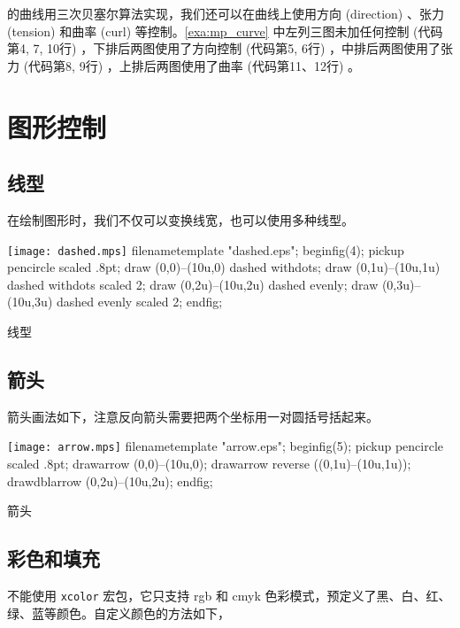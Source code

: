 \MP 的曲线用三次贝塞尔算法实现，我们还可以在曲线上使用方向 (direction) 、张力 (tension) 和曲率 (curl) 等控制。\autoref{exa:mp_curve} 中左列三图未加任何控制 (代码第4, 7, 10行) ，下排后两图使用了方向控制 (代码第5, 6行) ，中排后两图使用了张力 (代码第8, 9行) ，上排后两图使用了曲率 (代码第11、12行) 。

\section{图形控制}
\subsection{线型}

在绘制图形时，我们不仅可以变换线宽，也可以使用多种线型。

\begin{example}[htbp]
\begin{FBTDemo}[numbers=left]{\texttt{[image: dashed.mps]}}
filenametemplate "dashed.eps";
beginfig(4);
pickup pencircle scaled .8pt;
draw (0,0)--(10u,0) dashed withdots;
draw (0,1u)--(10u,1u) dashed withdots scaled 2;
draw (0,2u)--(10u,2u) dashed evenly;
draw (0,3u)--(10u,3u) dashed evenly scaled 2;
endfig;
\end{FBTDemo}
\caption{\MP 线型}
\label{exa:mp_dashed}
\end{example}

\subsection{箭头}

箭头画法如下，注意反向箭头需要把两个坐标用一对圆括号括起来。

\begin{example}[htbp]
\begin{FBTDemo}[numbers=left]{\texttt{[image: arrow.mps]}}
filenametemplate "arrow.eps";
beginfig(5);
pickup pencircle scaled .8pt;
drawarrow (0,0)--(10u,0);
drawarrow reverse ((0,1u)--(10u,1u));
drawdblarrow (0,2u)--(10u,2u);
endfig;
\end{FBTDemo}
\caption{\MP 箭头}
\label{exa:mp_arrow}
\end{example}

\subsection{彩色和填充}

\MP 不能使用 \texttt{xcolor} 宏包，它只支持 rgb 和 cmyk 色彩模式，预定义了黑、白、红、绿、蓝等颜色。自定义颜色的方法如下，

